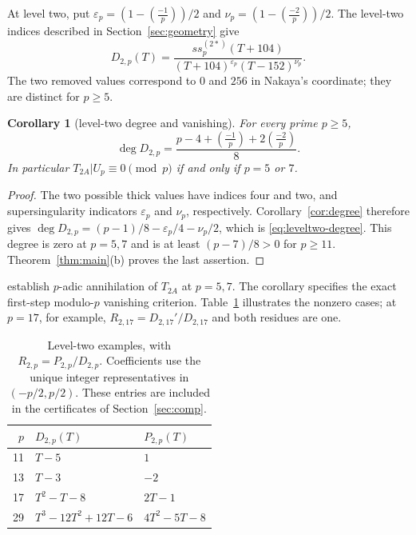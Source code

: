 \documentclass[11pt,a4paper]{article}
\numberwithin{equation}{section}
\newtheorem{corollary}[theorem]{Corollary}
\theoremstyle{definition}
\theoremstyle{remark}
\begin{document}
At level two, put
$\varepsilon_p=(1-\left(\frac{-1}{p}\right))/2$ and
$\nu_p=(1-\left(\frac{-2}{p}\right))/2$.
The level-two indices described in Section~\ref{sec:geometry} give
\begin{equation}\label{eq:leveltwo-denominator}
D_{2,p}(T)=\frac{ss_p^{(2*)}(T+104)}
{(T+104)^{\varepsilon_p}(T-152)^{\nu_p}}.
\end{equation}
The two removed values correspond to $0$ and $256$ in Nakaya's coordinate;
they are distinct for $p\ge5$.

\begin{corollary}[level-two degree and vanishing]\label{cor:leveltwo-vanishing}
For every prime $p\ge5$,
\begin{equation}\label{eq:leveltwo-degree}
\deg D_{2,p}=\frac{p-4+\left(\frac{-1}{p}\right)+2\left(\frac{-2}{p}\right)}8.
\end{equation}
In particular $T_{2A}|U_p\equiv0\pmod p$ if and only if $p=5$ or $7$.
\end{corollary}
\begin{proof}
The two possible thick values have indices four and two, and supersingularity
indicators $\varepsilon_p$ and $\nu_p$, respectively. Corollary~\ref{cor:degree}
therefore gives
$\deg D_{2,p}=(p-1)/8-\varepsilon_p/4-\nu_p/2$, which is
\eqref{eq:leveltwo-degree}. This degree is zero at $p=5,7$ and is at least
$(p-7)/8>0$ for $p\ge11$. Theorem~\ref{thm:main}(b) proves the last assertion.
\end{proof}

\citet[Lemma~4.8 and Table~4.3]{CMT19} establish $p$-adic
annihilation of $T_{2A}$ at $p=5,7$. The corollary specifies the exact
first-step modulo-$p$ vanishing criterion. Table~\ref{tab:leveltwo-examples}
illustrates the nonzero cases; at $p=17$, for example,
$R_{2,17}=D_{2,17}'/D_{2,17}$ and both residues are one.

\begin{table}[htbp]\centering
\begin{tabular}{rll}\toprule
$p$ & $D_{2,p}(T)$ & $P_{2,p}(T)$\\\midrule
11 & $T-5$ & $1$\\
13 & $T-3$ & $-2$\\
17 & $T^2-T-8$ & $2T-1$\\
29 & $T^3-12T^2+12T-6$ & $4T^2-5T-8$\\\bottomrule
\end{tabular}
\caption{Level-two examples, with $R_{2,p}=P_{2,p}/D_{2,p}$.
Coefficients use the unique integer representatives in $(-p/2,p/2)$.
These entries are included in the certificates of Section~\ref{sec:comp}.}
\label{tab:leveltwo-examples}
\end{table}
\end{document}

